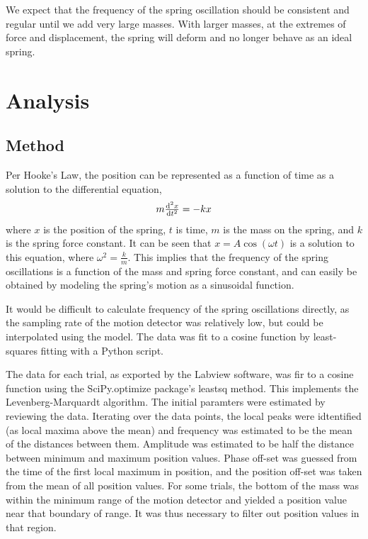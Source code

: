 \documentclass{article}
\numberwithin{figure}{section}
\numberwithin{table}{section}
\begin{document}
We expect that the frequency of the spring oscillation should be consistent and regular until we add very large masses.  With larger masses, at the extremes of force and displacement, the spring will deform and no longer behave as an ideal spring.

\section{Analysis} 

\subsection{Method} 

Per Hooke's Law, the position can be represented as a function of time as a solution to the differential equation, 
\begin{equation} 
	m \od[2]{x}{t} = -kx 
\end{equation} 
where $x$ is the position of the spring, $t$ is time, $m$ is the mass on the spring, and $k$ is the spring force constant.  It can be seen that $x = A \cos \left( \omega t \right)$ is a solution to this equation, where $\omega^2 = \frac{k}{m}$.  This implies that the frequency of the spring oscillations is a function of the mass and spring force constant, and can easily be obtained by modeling the spring's motion as a sinusoidal function.

It would be difficult to calculate frequency of the spring oscillations directly, as the sampling rate of the motion detector was relatively low, but could be interpolated using the model.  The data was fit to a cosine function by least-squares fitting with a Python script.

The data for each trial, as exported by the Labview software, was fir to a cosine function using the SciPy.optimize package's leastsq method.  This implements the Levenberg-Marquardt algorithm.  The initial paramters were estimated by reviewing the data.  Iterating over the data points, the local peaks were idtentified (as local maxima above the mean) and frequency was estimated to be the mean of the distances between them.  Amplitude was estimated to be half the distance between minimum and maximum position values.  Phase off-set was guessed from the time of the first local maximum in position, and the position off-set was taken from the mean of all position values.  For some trials, the bottom of the mass was within the minimum range of the motion detector and yielded a position value near that boundary of range.  It was thus necessary to filter out position values in that region.
\end{document}
